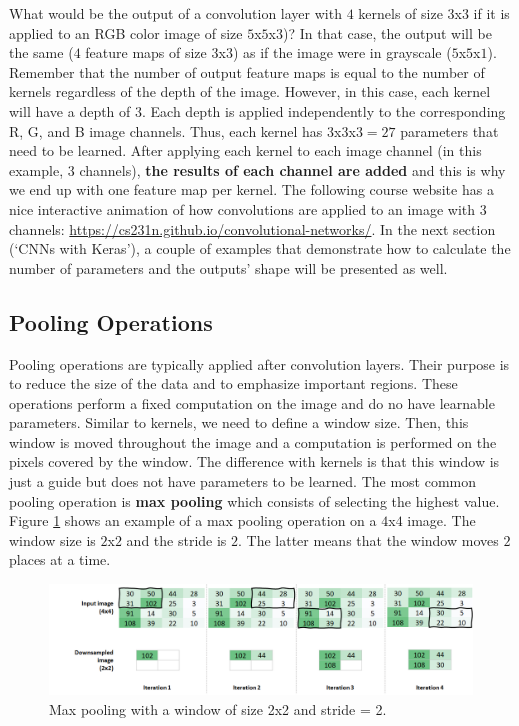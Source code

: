 \documentclass[
  11pt,
]{krantz}
\begin{document}
What would be the output of a convolution layer with \(4\) kernels of size \(3\)x\(3\) if it is applied to an RGB color image of size \(5\)x\(5\)x\(3\))? In that case, the output will be the same (\(4\) feature maps of size \(3\)x\(3\)) as if the image were in grayscale (\(5\)x\(5\)x\(1\)). Remember that the number of output feature maps is equal to the number of kernels regardless of the depth of the image. However, in this case, each kernel will have a depth of \(3\). Each depth is applied independently to the corresponding R, G, and B image channels. Thus, each kernel has \(3\)x\(3\)x\(3=27\) parameters that need to be learned. After applying each kernel to each image channel (in this example, \(3\) channels), \textbf{the results of each channel are added} and this is why we end up with one feature map per kernel. The following course website has a nice interactive animation of how convolutions are applied to an image with \(3\) channels: \url{https://cs231n.github.io/convolutional-networks/}. In the next section (`CNNs with Keras'), a couple of examples that demonstrate how to calculate the number of parameters and the outputs' shape will be presented as well.

\hypertarget{pooling-operations}{%
\subsection{Pooling Operations}\label{pooling-operations}}

Pooling operations are typically applied after convolution layers. Their purpose is to reduce the size of the data and to emphasize important regions. These operations perform a fixed computation on the image and do no have learnable parameters. Similar to kernels, we need to define a window size. Then, this window is moved throughout the image and a computation is performed on the pixels covered by the window. The difference with kernels is that this window is just a guide but does not have parameters to be learned. The most common pooling operation is \textbf{max pooling} which consists of selecting the highest value.
Figure \ref{fig:cnnMaxPooling} shows an example of a max pooling operation on a \(4\)x\(4\) image. The window size is \(2\)x\(2\) and the stride is \(2\). The latter means that the window moves \(2\) places at a time.

\begin{figure}

{\centering \includegraphics[width=1\linewidth]{images/cnn_maxpooling} 

}

\caption{Max pooling with a window of size 2x2 and stride = 2.}\label{fig:cnnMaxPooling}
\end{figure}
\end{document}

